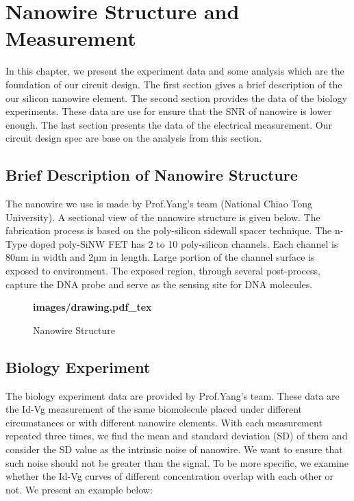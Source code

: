 \chapter{Nanowire Structure and Measurement}
In this chapter, we present the experiment data and some analysis which are the foundation of our circuit design.
The first section gives a brief description of the our silicon nanowire element.
The second section provides the data of the biology experiments.
These data are use for ensure that the SNR of nanowire is lower enough.
The last section presents the data of the electrical measurement.
Our circuit design spec are base on the analysis from this section.

\section{Brief Description of Nanowire Structure}
The nanowire we use is made by Prof.Yang's team (National Chiao Tong University)\cite{C5}.
A sectional view of the nanowire structure is given below.
The fabrication process is based on the poly-silicon sidewall spacer technique.
The n-Type doped poly-SiNW FET has 2 to 10 poly-silicon channels.
Each channel is 80nm in width and 2µm in length.
Large portion of the channel surface is exposed to environment.
The exposed region, through several post-process, capture the DNA probe and serve as the sensing site for DNA molecules.\cite{C5, C6}

\begin{figure}[!htbp]
    \centering
    {\selectfont\textbf{
        \def\svgwidth{5.0cm}
        \fontsize{6}{7}\selectfont
         {images/drawing.pdf_tex}
    }}
    \fontsize{6}{7}\selectfont
    \caption{Nanowire Structure}
    \label{fig:drawing}
\end{figure}


\section{Biology Experiment}
The biology experiment data are provided by Prof.Yang's team.
These data are the Id-Vg measurement of the same biomolecule placed under different circumstances or with different nanowire elements.
With each measurement repeated three times, we find the mean and standard deviation (SD) of them and consider the SD value as the intrinsic noise of nanowire.
We want to ensure that such noise should not be greater than the signal.
To be more specific, we examine whether the Id-Vg curves of different concentration overlap with each other or not.
We present an example below:


